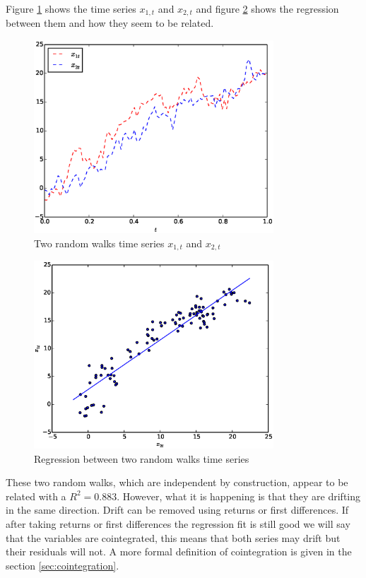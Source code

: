 Figure \ref{fig:spurious1} shows the time series $x_{1,t}$ and $x_{2,t}$ and
figure \ref{fig:spurious2} shows the regression between them and how they seem
to be related.
\begin{figure}[!h]
  \centering
  \includegraphics[width=0.8\textwidth]{img/spurious1}
  \caption[Random walks time series]{Two random walks time series $x_{1,t}$ and $x_{2,t}$}
  \label{fig:spurious1}
\end{figure}

\begin{figure}[!h]
  \centering
  \includegraphics[width=0.8\textwidth]{img/spurious2}
  \caption{Regression between two random walks time series}
  \label{fig:spurious2}
\end{figure}

These two random walks, which are independent by construction, appear to be
related with a $R^2=0.883$. However, what it is happening is that they are
drifting in the same direction. Drift can be removed using returns or first
differences.  If after taking returns or first differences the regression fit
is still good we will say that the variables are cointegrated, this means that
both series may drift but their residuals will not. A more formal definition of
cointegration is given in the section \ref{sec:cointegration}.

